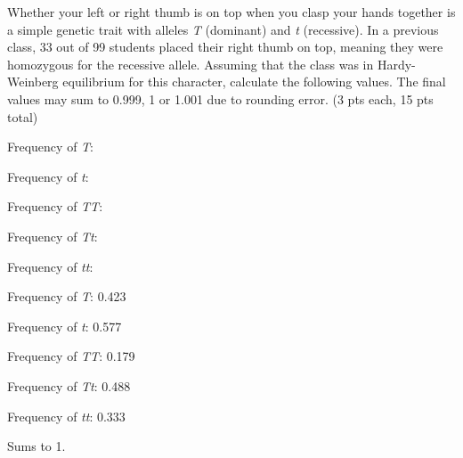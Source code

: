 
\question[15]
Whether your left or right thumb is on top when you clasp your hands together is a simple genetic trait with alleles \textit{T} (dominant) and \textit{t} (recessive).  In a previous class, 33 out of 99 students placed their right thumb on top, meaning they were homozygous for the recessive allele.  Assuming that the class was in Hardy-Weinberg equilibrium for this character, calculate the following values. The final values may sum to 0.999, 1 or 1.001 due to rounding error. (3 pts each, 15 pts total)

\vspace{2\baselineskip}
Frequency of \textit{T}:

\vspace{2\baselineskip}
Frequency of \textit{t}:

\vspace{2\baselineskip}
Frequency of \textit{TT}:

\vspace{2\baselineskip}
Frequency of \textit{Tt}:

\vspace{2\baselineskip}
Frequency of \textit{tt}: 

\begin{solution}

\vspace{2\baselineskip}
Frequency of \textit{T}: 0.423

\vspace{2\baselineskip}
Frequency of \textit{t}: 0.577

\vspace{2\baselineskip}
Frequency of \textit{TT}: 0.179

\vspace{2\baselineskip}
Frequency of \textit{Tt}: 0.488

\vspace{2\baselineskip}
Frequency of \textit{tt}: 0.333

\vspace{\baselineskip}
Sums to 1.
\end{solution}